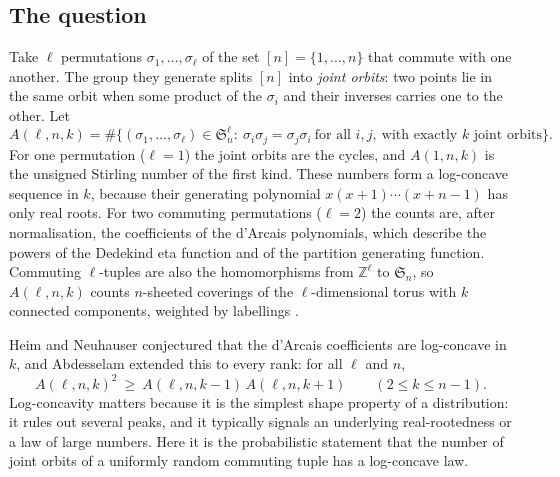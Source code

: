 \documentclass[11pt,a4paper]{article}
\theoremstyle{remark}
\numberwithin{equation}{section}
\begin{document}
\subsection{The question}
Take $\ell$ permutations $\sigma_1,\dots,\sigma_\ell$ of the set $[n]=\{1,\dots,n\}$ that commute with one another. The group they generate splits $[n]$ into \emph{joint orbits}: two points lie in the same orbit when some product of the $\sigma_i$ and their inverses carries one to the other. Let
\[
A(\ell,n,k)=\#\bigl\{(\sigma_1,\ldots,\sigma_\ell)\in\mathfrak S_n^{\ell}:\ \sigma_i\sigma_j=\sigma_j\sigma_i\ \text{for all } i,j,\ \text{with exactly $k$ joint orbits}\bigr\}.
\]
For one permutation ($\ell=1$) the joint orbits are the cycles, and $A(1,n,k)$ is the unsigned Stirling number of the first kind. These numbers form a log-concave sequence in $k$, because their generating polynomial $x(x+1)\cdots(x+n-1)$ has only real roots. For two commuting permutations ($\ell=2$) the counts are, after normalisation, the coefficients of the d'Arcais polynomials, which describe the powers of the Dedekind eta function and of the partition generating function. Commuting $\ell$-tuples are also the homomorphisms from $\mathbb Z^\ell$ to $\mathfrak S_n$, so $A(\ell,n,k)$ counts $n$-sheeted coverings of the $\ell$-dimensional torus with $k$ connected components, weighted by labellings \cite{BryanFulman,ABDV}.

Heim and Neuhauser \cite{HeimNeuhauser} conjectured that the d'Arcais coefficients are log-concave in $k$, and Abdesselam \cite[Conjecture~1.1]{Abdesselam2025a} extended this to every rank: for all $\ell$ and $n$,
\begin{equation}\label{eq:conj}
A(\ell,n,k)^2\ \ge\ A(\ell,n,k-1)\,A(\ell,n,k+1)\qquad(2\le k\le n-1).
\end{equation}
Log-concavity matters because it is the simplest shape property of a distribution: it rules out several peaks, and it typically signals an underlying real-rootedness or a law of large numbers. Here it is the probabilistic statement that the number of joint orbits of a uniformly random commuting tuple has a log-concave law.
\end{document}
